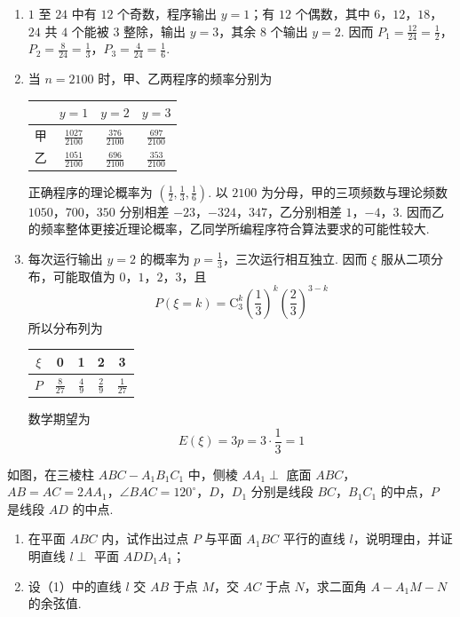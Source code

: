 \begin{solution}
\begin{enumerate}
\item \(1\) 至 \(24\) 中有 \(12\) 个奇数，程序输出 \(y=1\)；有 \(12\) 个偶数，其中 \(6\)，\(12\)，\(18\)，\(24\) 共 \(4\) 个能被 \(3\) 整除，输出 \(y=3\)，其余 \(8\) 个输出 \(y=2\). 因而 \(P_1=\frac{12}{24}=\frac12\)，\(P_2=\frac{8}{24}=\frac13\)，\(P_3=\frac{4}{24}=\frac16\).

\item 当 \(n=2100\) 时，甲、乙两程序的频率分别为
\begin{center}
\begin{tabular}{c|ccc}
 & \(y=1\) & \(y=2\) & \(y=3\) \\ \hline
甲 & \(\frac{1027}{2100}\) & \(\frac{376}{2100}\) & \(\frac{697}{2100}\) \\
乙 & \(\frac{1051}{2100}\) & \(\frac{696}{2100}\) & \(\frac{353}{2100}\)
\end{tabular}
\end{center}
正确程序的理论概率为 \(\left(\frac12,\frac13,\frac16\right)\). 以 \(2100\) 为分母，甲的三项频数与理论频数 \(1050\)，\(700\)，\(350\) 分别相差 \(-23\)，\(-324\)，\(347\)，乙分别相差 \(1\)，\(-4\)，\(3\). 因而乙的频率整体更接近理论概率，乙同学所编程序符合算法要求的可能性较大.

\item 每次运行输出 \(y=2\) 的概率为 \(p=\frac13\)，三次运行相互独立. 因而 \(\xi\) 服从二项分布，可能取值为 \(0\)，\(1\)，\(2\)，\(3\)，且
\[
P(\xi=k)=\mathrm C_3^k\left(\frac13\right)^k\left(\frac23\right)^{3-k}
\]
所以分布列为
\begin{center}
\begin{tabular}{c|cccc}
\(\xi\) & 0 & 1 & 2 & 3 \\ \hline
\(P\) & \(\frac{8}{27}\) & \(\frac{4}{9}\) & \(\frac{2}{9}\) & \(\frac{1}{27}\)
\end{tabular}
\end{center}
数学期望为
\[
E(\xi)=3p=3\cdot\frac13=1
\]
\end{enumerate}
\end{solution}

\begin{problem}
如图，在三棱柱 \(ABC - A_{1}B_{1}C_{1}\) 中，侧棱 \(AA_{1} \perp\) 底面 \(ABC\)，\(AB = AC = 2AA_{1}\)，\(\angle BAC = 120^{\circ}\)，\(D\)，\(D_{1}\) 分别是线段 \(BC\)，\(B_{1}C_{1}\) 的中点，\(P\) 是线段 \(AD\) 的中点.
\begin{enumerate}
\item 在平面 \(ABC\) 内，试作出过点 \(P\) 与平面 \(A_{1}BC\) 平行的直线 \(l\)，说明理由，并证明直线 \(l \perp\) 平面 \(ADD_{1}A_{1}\)；
\item 设（1）中的直线 \(l\) 交 \(AB\) 于点 \(M\)，交 \(AC\) 于点 \(N\)，求二面角 \(A-A_{1}M-N\) 的余弦值.
\end{enumerate}
\end{problem}

